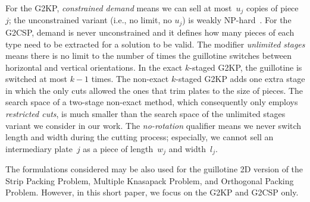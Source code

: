 \documentclass[9pt]{entcs}
\begin{document}
For the G2KP, \emph{constrained demand} means we can sell at most~\(u_j\) copies of piece~\(j\); the unconstrained variant (i.e., no limit, no \(u_j\)) is weakly NP-hard~\cite{beasley:1985:guillotine}. %
For the G2CSP, demand is never unconstrained and it defines how many pieces of each type need to be extracted for a solution to be valid.
The modifier \emph{unlimited stages} means there is no limit to the number of times the guillotine switches between horizontal and vertical orientations.
In the exact \(k\)-staged G2KP, the guillotine is switched at most \(k-1\) times. %
The non-exact \(k\)-staged G2KP adds one extra stage in which the only cuts allowed the ones that trim plates to the size of pieces.
The search space of a two-stage non-exact method, which consequently only employs \emph{restricted cuts}, is much smaller than the search space of the unlimited stages variant we consider in our work.
The \emph{no-rotation} qualifier means we never switch length and width during the cutting process; especially, we cannot sell an intermediary plate~\(j\) as a piece of length~\(w_j\) and width~\(l_j\).


The formulations considered may be also used for the guillotine 2D version of the Strip Packing Problem, Multiple Knasapack Problem, and Orthogonal Packing Problem.
However, in this short paper, we focus on the G2KP and G2CSP only.
\end{document}
